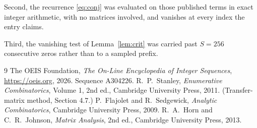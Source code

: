 \documentclass[11pt,a4paper]{article}
\theoremstyle{plain}
\theoremstyle{definition}
\begin{document}
Second, the recurrence \eqref{eq:conj} was evaluated on those published terms in exact
integer arithmetic, with no matrices involved, and vanishes at every index the entry claims.

Third, the vanishing test of Lemma~\ref{lem:crit} was carried past $S=256$ consecutive
zeros rather than to a sampled prefix.

\begin{thebibliography}{9}
 The OEIS Foundation, \emph{The On-Line Encyclopedia of Integer
Sequences}, \url{https://oeis.org}, 2026. Sequence A304226.
 R.~P.~Stanley, \emph{Enumerative Combinatorics}, Volume 1, 2nd ed.,
Cambridge University Press, 2011. (Transfer-matrix method, Section 4.7.)
 P.~Flajolet and R.~Sedgewick, \emph{Analytic Combinatorics}, Cambridge
University Press, 2009.
 R.~A.~Horn and C.~R.~Johnson, \emph{Matrix Analysis}, 2nd ed., Cambridge
University Press, 2013.
\end{thebibliography}
\end{document}
